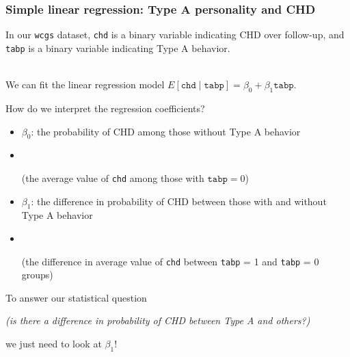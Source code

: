 \documentclass[10pt,t]{beamer}
\begin{document}
\begin{frame}
	\frametitle{Simple linear regression: Type A personality and CHD}
	
	In our \texttt{wcgs} dataset, \texttt{chd} is a binary variable indicating CHD over follow-up, and \texttt{tabp} is a binary variable indicating Type A behavior. 
	\\ ~\
	
	We can fit the linear regression model $E[\texttt{chd} \mid \texttt{tabp}] = \beta_0 + \beta_1\texttt{tabp} $.
	
	How do we interpret the regression coefficients? \vspace{0.3cm}
	
	\begin{itemize}
		\item \color{blue} $\beta_0$: \pause the probability of CHD among those without Type A behavior \pause \color{black}\vspace{-0.2cm}
		\item[] \ \ \begin{scriptsize} (the average value of \texttt{chd} among those with $\texttt{tabp} = 0$) \end{scriptsize} \pause
		\item \color{blue} $\beta_1$: \pause the difference in probability of CHD between those with and without Type A behavior \pause \color{black} \vspace{-0.2cm}
		\item[] \ \ \begin{scriptsize}(the difference in average value of \texttt{chd} between \texttt{tabp} = 1 and \texttt{tabp} = 0 groups) \pause \end{scriptsize}
	\end{itemize} 
	
	\vspace{0.3cm}
	To answer our statistical question \begin{small}\textit{(is there a difference in probability of CHD between Type A and others?)}\end{small} we just need to look at $\beta_1$!
\end{frame}
\end{document}
